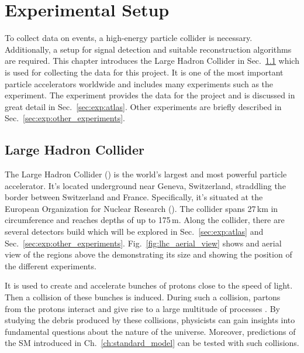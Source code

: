 \documentclass[bachelor,ngerman,english]{GAUBM}
\begin{document}
\chapter{Experimental Setup}
\label{ch:experimental_setup}
To collect data on \ttHWW events, a high-energy particle collider is necessary. Additionally, a setup for signal detection and suitable reconstruction algorithms are required. This chapter introduces the Large Hadron Collider in Sec.~\ref{sec:exp:lhc} which is used for collecting the data for this project. It is one of the most important particle accelerators worldwide and includes many experiments such as the \atlas experiment. The \atlas experiment provides the data for the project and is discussed in great detail in Sec.~\ref{sec:exp:atlas}. Other experiments are briefly described in Sec.~\ref{sec:exp:other_experiments}.

\section{Large Hadron Collider}
\label{sec:exp:lhc}
The Large Hadron Collider (\lhc) \cite{lhc_01,lhc_02} is the world's largest and most powerful particle accelerator. It's located underground near Geneva, Switzerland, straddling the border between Switzerland and France. Specifically, it's situated at the European Organization for Nuclear Research (\cern). The collider spans 27\,km in circumference and reaches depths of up to 175\,m. Along the collider, there are several detectors build which will be explored in Sec.~\ref{sec:exp:atlas} and Sec.~\ref{sec:exp:other_experiments}. Fig.~\ref{fig:lhc_aerial_view} shows and aerial view of the regions above the \lhc demonstrating its size and showing the position of the different experiments.

It is used to create and accelerate bunches of protons close to the speed of light. Then a collision of these bunches is induced. During such a collision, partons from the protons interact and give rise to a large multitude of processes \cite{theory:general_particles_nuclei}. By studying the debris produced by these collisions, physicists can gain insights into fundamental questions about the nature of the universe. Moreover, predictions of the SM introduced in Ch.~\ref{ch:standard_model} can be tested with such collisions. 
\end{document}
